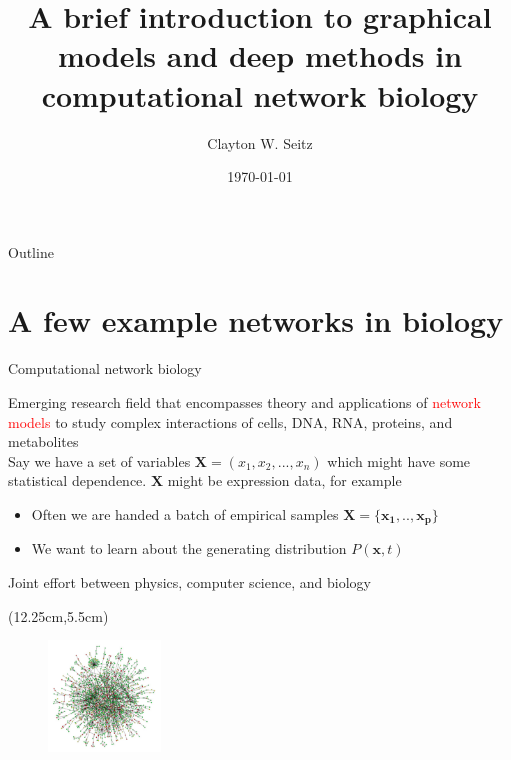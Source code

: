 \documentclass[aspectratio=1610]{beamer}					%
\title{A brief introduction to graphical models and deep methods in computational network biology}	%
\author{Clayton W. Seitz}								%
\date{\today}									%
\begin{document}
\begin{frame}
  \titlepage
\end{frame}

\begin{frame}{Outline}
  \tableofcontents
\end{frame}

%

\section{A few example networks in biology}

\begin{frame}{Computational network biology}

Emerging research field that encompasses theory and applications of \textcolor{red}{network models} to study complex interactions of cells, DNA, RNA, proteins, and metabolites\\
\vspace{0.2in}
Say we have a set of variables $\bm{X} = (x_{1},x_{2},...,x_{n})$ which might have some statistical dependence. $\bm{X}$ might be expression data, for example\\
\vspace{0.2in}
\begin{itemize}
\item Often we are handed a batch of empirical samples $\bm{X} = \{\bm{x_{1}},..,\bm{x_{p}}\}$
\item We want to learn about the generating distribution $P(\bm{x},t)$
\end{itemize}

\vspace{0.2in}
Joint effort between physics, computer science, and biology

\begin{textblock*}{3cm}(12.25cm,5.5cm)
\begin{figure}
\includegraphics[width=3cm]{net.png}
\end{figure}
\end{textblock*}

\end{frame}
\end{document}
